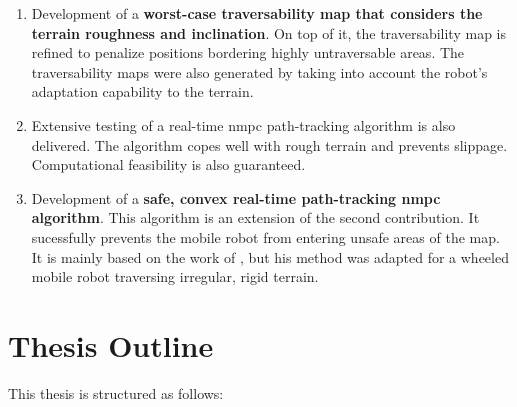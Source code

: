 \begin{enumerate}
	\item Development of a \textbf{worst-case traversability map that considers the terrain roughness and inclination}. On top of it, the traversability map is refined to penalize positions bordering highly untraversable areas. The traversability maps were also generated by taking into account the robot's adaptation capability to the terrain. 
	\item Extensive testing of a real-time \acrlong{nmpc} path-tracking algorithm is also delivered. The algorithm copes well with rough terrain and prevents slippage. Computational feasibility is also guaranteed.
	\item Development of a \textbf{safe, convex real-time path-tracking \acrlong{nmpc} algorithm}. This algorithm is an extension of the second contribution. It sucessfully prevents the mobile robot from entering unsafe areas of the map. It is mainly based on the work of \citet{schoels2020ciao}, but his method was adapted for a wheeled mobile robot traversing irregular, rigid terrain.
\end{enumerate}


\section{Thesis Outline}
\label{section:outline}

This thesis is structured as follows:

